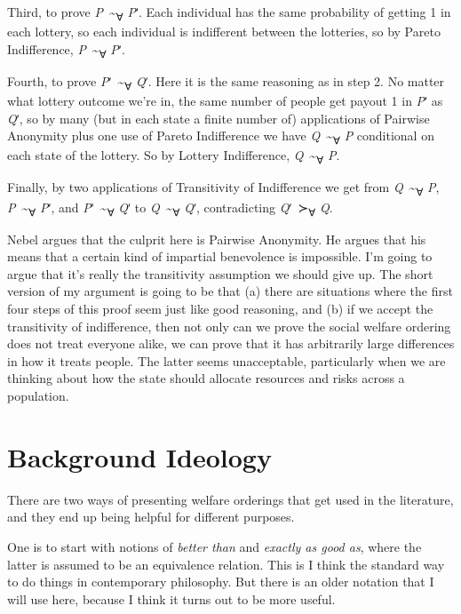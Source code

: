 \documentclass[
  11pt,
  letterpaper,
  DIV=11,
  numbers=noendperiod,
  twoside]{scrartcl}
\begin{document}
Third, to prove \emph{P}~\textasciitilde{}\textsubscript{∀} \emph{P}ʹ.
Each individual has the same probability of getting 1 in each lottery,
so each individual is indifferent between the lotteries, so by Pareto
Indifference, \emph{P}~\textasciitilde{}\textsubscript{∀} \emph{P}ʹ.

Fourth, to prove \emph{P}ʹ~\textasciitilde{}\textsubscript{∀} \emph{Q}ʹ.
Here it is the same reasoning as in step 2. No matter what lottery
outcome we're in, the same number of people get payout 1 in \emph{P}ʹ as
\emph{Q}ʹ, so by many (but in each state a finite number of)
applications of Pairwise Anonymity plus one use of Pareto Indifference
we have \emph{Q}~\textasciitilde{}\textsubscript{∀} \emph{P} conditional
on each state of the lottery. So by Lottery Indifference,
\emph{Q}~\textasciitilde{}\textsubscript{∀} \emph{P}.

Finally, by two applications of Transitivity of Indifference we get from
\emph{Q}~\textasciitilde{}\textsubscript{∀} \emph{P},
\emph{P}~\textasciitilde{}\textsubscript{∀} \emph{P}ʹ, and
\emph{P}ʹ~\textasciitilde{}\textsubscript{∀} \emph{Q}ʹ to
\emph{Q}~\textasciitilde{}\textsubscript{∀} \emph{Q}ʹ, contradicting
\emph{Q}ʹ~≻\textsubscript{∀} \emph{Q}.

Nebel argues that the culprit here is Pairwise Anonymity. He argues that
his means that a certain kind of impartial benevolence is impossible.
I'm going to argue that it's really the transitivity assumption we
should give up. The short version of my argument is going to be that (a)
there are situations where the first four steps of this proof seem just
like good reasoning, and (b) if we accept the transitivity of
indifference, then not only can we prove the social welfare ordering
does not treat everyone alike, we can prove that it has arbitrarily
large differences in how it treats people. The latter seems
unacceptable, particularly when we are thinking about how the state
should allocate resources and risks across a population.

\section{Background Ideology}\label{sec-ideology}

There are two ways of presenting welfare orderings that get used in the
literature, and they end up being helpful for different purposes.

One is to start with notions of \emph{better than} and \emph{exactly as
good as}, where the latter is assumed to be an equivalence relation.
This is I think the standard way to do things in contemporary
philosophy. But there is an older notation that I will use here, because
I think it turns out to be more useful.
\end{document}
